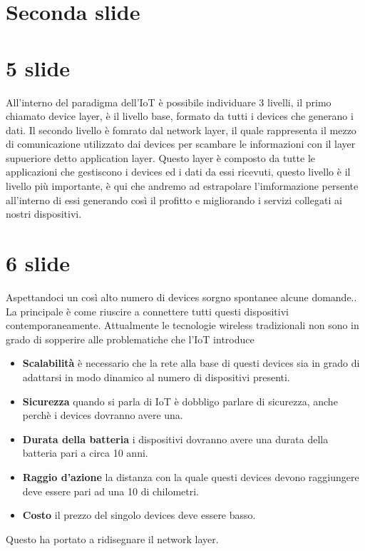 \documentclass[12pt]{article}
\begin{document}
\section{Seconda slide}
\section{5 slide}
All'interno del paradigma dell'IoT è possibile individuare 3 livelli, il primo
chiamato device layer, è il livello base, formato da tutti i devices che generano i dati.
Il secondo livello è fomrato dal network layer, il quale rappresenta il mezzo di
comunicazione utilizzato dai devices per scambare le informazioni con il layer
supueriore detto application layer. Questo layer è composto da tutte le
applicazioni che gestiscono i devices ed i dati da essi ricevuti, questo livello
è il livello più importante, è qui che andremo ad estrapolare l'imformazione
persente all'interno di essi generando così il profitto e migliorando i servizi
collegati ai nostri dispositivi.
\section{6 slide}
Aspettandoci un così alto numero di devices sorgno spontanee alcune domande..
La principale è come riuscire a connettere tutti questi dispositivi
contemporaneamente. 
Attualmente le tecnologie wireless tradizionali non sono in grado di sopperire 
alle problematiche che l'IoT introduce  
\begin{itemize}
	\item	\textbf{Scalabilità} è necessario che la rete alla base di questi devices
			sia in grado di adattarsi in modo dinamico al numero di dispositivi
			presenti.
	\item	\textbf{Sicurezza} quando si parla di IoT è dobbligo parlare di
			sicurezza, anche perchè i devices dovranno avere una. 
	\item	\textbf{Durata della batteria} i dispositivi dovranno avere una
			durata della batteria pari a circa 10 anni.
	\item	\textbf{Raggio d'azione} la distanza con la quale questi devices
			devono raggiungere deve essere pari ad una 10 di chilometri.
	\item	\textbf{Costo} il prezzo del singolo devices deve essere basso.
\end{itemize}
Questo ha portato a ridisegnare il network layer.
\end{document}
